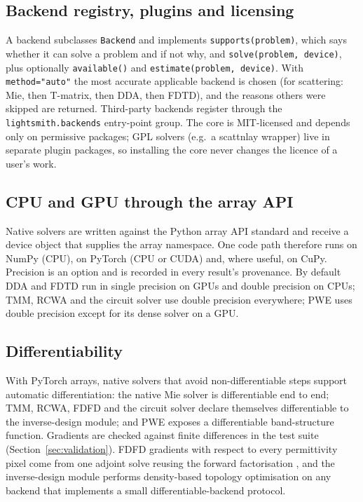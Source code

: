 \documentclass[11pt]{article}
\newcommand{\code}[1]{\texttt{#1}}
\begin{document}
\subsection{Backend registry, plugins and licensing}
A backend subclasses \code{Backend} and implements \code{supports(problem)}, which says whether it
can solve a problem and if not why, and \code{solve(problem, device)}, plus optionally
\code{available()} and \code{estimate(problem, device)}. With \code{method="auto"} the most
accurate applicable backend is chosen (for scattering: Mie, then T-matrix, then DDA, then FDTD),
and the reasons others were skipped are returned. Third-party backends register through the
\code{lightsmith.backends} entry-point group. The core is MIT-licensed and depends only on
permissive packages; GPL solvers (e.g.\ a scattnlay \cite{PenaPal2009} wrapper) live in separate
plugin packages, so installing the core never changes the licence of a user's work.

\subsection{CPU and GPU through the array API}
Native solvers are written against the Python array API standard \cite{ArrayAPI} and receive a
device object that supplies the array namespace. One code path therefore runs on NumPy (CPU), on
PyTorch (CPU or CUDA) and, where useful, on CuPy. Precision is an option and is recorded in every
result's provenance. By default DDA and FDTD run in single precision on GPUs and double precision on
CPUs; TMM, RCWA and the circuit solver use double precision everywhere; PWE uses double precision
except for its dense solver on a GPU.

\subsection{Differentiability}
With PyTorch arrays, native solvers that avoid non-differentiable steps support automatic
differentiation: the native Mie solver is differentiable end to end; TMM, RCWA, FDFD and the circuit
solver declare themselves differentiable to the inverse-design module; and PWE exposes a
differentiable band-structure function. Gradients are checked against finite differences in the
test suite (Section~\ref{sec:validation}). FDFD gradients with respect to every
permittivity pixel come from one adjoint solve reusing the forward factorisation
\cite{Hughes2018adjoint}, and the inverse-design module performs density-based topology
optimisation \cite{BendsoeSigmund2004,Molesky2018} on any backend that implements a small
differentiable-backend protocol.
\end{document}
